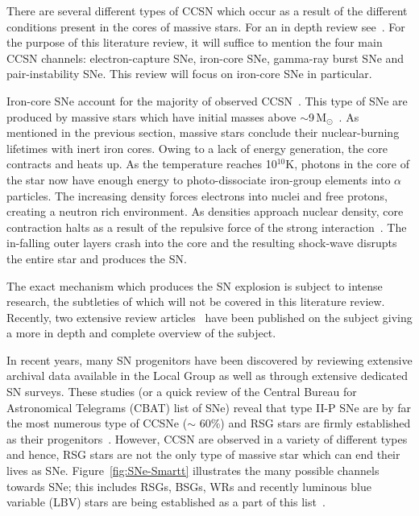 There are several different types of CCSN which occur as a result of the different conditions present in the cores of massive stars.
For an in depth review see~\cite{Janka12}.
For the purpose of this literature review, it will suffice to mention the four main CCSN channels: electron-capture SNe, iron-core SNe, gamma-ray burst SNe and pair-instability SNe.
This review will focus on iron-core SNe in particular.

Iron-core SNe account for the majority of observed CCSN~\citep{Smartt09,Janka12,Eldridge13}.
This type of SNe are produced by massive stars which have initial masses above $\sim$9\,M$_{\odot}$~\citep{Poelarends08}.
As mentioned in the previous section, massive stars conclude their nuclear-burning lifetimes with inert iron cores.
Owing to a lack of energy generation, the core contracts and heats up.
As the temperature reaches 10$^{10}$K, photons in the core of the star now have enough energy to photo-dissociate iron-group elements into $\alpha$ particles.
The increasing density forces electrons into nuclei and free protons, creating a neutron rich environment.
As densities approach nuclear density, core contraction halts as a result of the repulsive force of the strong interaction~\citep{Janka12}.
The in-falling outer layers crash into the core and the resulting shock-wave disrupts the entire star and produces the SN.

The exact mechanism which produces the SN explosion is subject to intense research, the subtleties of which will not be covered in this literature review.
Recently, two extensive review articles~\citep{Janka12, Burrows13} have been published on the subject giving a more in depth and complete overview of the subject.

In recent years, many SN progenitors have been discovered by reviewing extensive archival data available in the Local Group as well as through extensive dedicated SN surveys.
These studies (or a quick review of the Central Bureau for Astronomical Telegrams (CBAT) list of SNe\footnotemark) reveal that type II-P SNe are by far the most numerous type of CCSNe ($\sim$ 60\%) and RSG stars are firmly established as their progenitors~\citep[][and references therein]{Smartt09}.
However, CCSN are observed in a variety of different types and hence, RSG stars are not the only type of massive star which can end their lives as SNe.
Figure~\ref{fig:SNe-Smartt} illustrates the many possible channels towards SNe; this includes RSGs, BSGs, WRs and recently luminous blue variable (LBV) stars are being established as a part of this list~\citep[e.g.][]{Smartt09, Groh13}.

